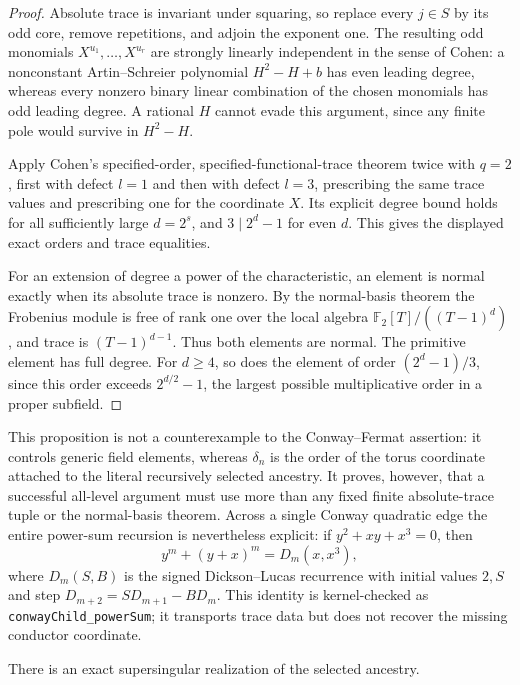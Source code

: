 \documentclass[11pt]{article}
\theoremstyle{definition}
\theoremstyle{remark}
\begin{document}
\begin{proof}
Absolute trace is invariant under squaring, so replace every $j\in S$ by its
odd core, remove repetitions, and adjoin the exponent one.  The resulting
odd monomials $X^{u_1},\ldots,X^{u_r}$ are strongly linearly independent in
the sense of Cohen: a nonconstant Artin--Schreier polynomial $H^2-H+b$ has
even leading degree, whereas every nonzero binary linear combination of the
chosen monomials has odd leading degree.  A rational $H$ cannot evade this
argument, since any finite pole would survive in $H^2-H$.

Apply Cohen's specified-order, specified-functional-trace theorem
\cite[Theorem~1.1]{cohen2005specified} twice with $q=2$, first with defect
$l=1$ and then with defect $l=3$, prescribing the same trace values and
prescribing one for the coordinate $X$.  Its explicit degree bound holds for
all sufficiently large $d=2^s$, and $3\mid2^d-1$ for even $d$.  This gives
the displayed exact orders and trace equalities.

For an extension of degree a power of the characteristic, an element is
normal exactly when its absolute trace is nonzero.  By the normal-basis
theorem the Frobenius module is free of rank one over the local algebra
$\mathbb F_2[T]/((T-1)^d)$, and trace is $(T-1)^{d-1}$.
Thus both elements are normal.  The primitive element has full degree.  For
$d\ge4$, so does the element of order $(2^d-1)/3$, since this order exceeds
$2^{d/2}-1$, the largest possible multiplicative order in a proper subfield.
\end{proof}

This proposition is not a counterexample to the Conway--Fermat assertion:
it controls generic field elements, whereas $\delta_n$ is the order of the
torus coordinate attached to the literal recursively selected ancestry.
It proves, however, that a successful all-level argument must use more than
any fixed finite absolute-trace tuple or the normal-basis theorem.  Across a
single Conway quadratic edge the entire power-sum recursion is nevertheless
explicit: if $y^2+xy+x^3=0$, then
\[
 y^m+(y+x)^m=D_m(x,x^3),
\]
where $D_m(S,B)$ is the signed Dickson--Lucas recurrence with initial values
$2,S$ and step $D_{m+2}=S D_{m+1}-B D_m$.  This identity is kernel-checked as
\texttt{conwayChild\_powerSum}; it transports trace data but does not recover
the missing conductor coordinate.

There is an exact supersingular realization of the selected ancestry.
\end{document}
